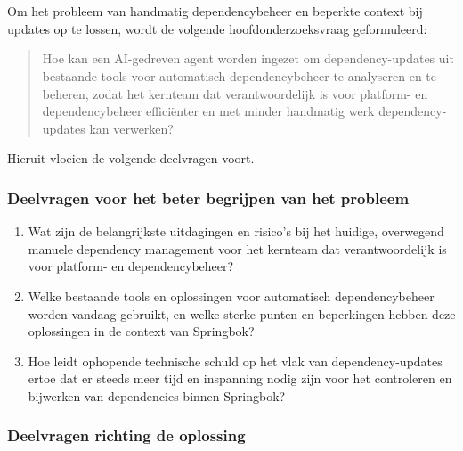\section{}%
\label{sec:onderzoeksvraag}

Om het probleem van handmatig dependencybeheer en beperkte context bij updates op te lossen, wordt de volgende hoofdonderzoeksvraag geformuleerd:

\begin{quote}
  Hoe kan een AI-gedreven agent worden ingezet om dependency-updates uit bestaande tools voor automatisch dependencybeheer te analyseren en te beheren, zodat het kernteam dat verantwoordelijk is voor platform- en dependencybeheer efficiënter en met minder handmatig werk dependency-updates kan verwerken?
\end{quote}

Hieruit vloeien de volgende deelvragen voort.

\subsubsection{Deelvragen voor het beter begrijpen van het probleem}
\label{sec:Deelvragen_voor_het_beter_begrijpen_van_het_probleem}

\begin{enumerate}
  \item Wat zijn de belangrijkste uitdagingen en risico's bij het huidige, overwegend manuele dependency management voor het kernteam dat verantwoordelijk is voor platform- en dependencybeheer?
  \item Welke bestaande tools en oplossingen voor automatisch dependencybeheer worden vandaag gebruikt, en welke sterke punten en beperkingen hebben deze oplossingen in de context van Springbok?
  \item Hoe leidt ophopende technische schuld op het vlak van dependency-updates ertoe dat er steeds meer tijd en inspanning nodig zijn voor het controleren en bijwerken van dependencies binnen Springbok?
\end{enumerate}

\subsubsection{Deelvragen richting de oplossing}
\label{sec:Deelvragen_richting_de_oplossing}

